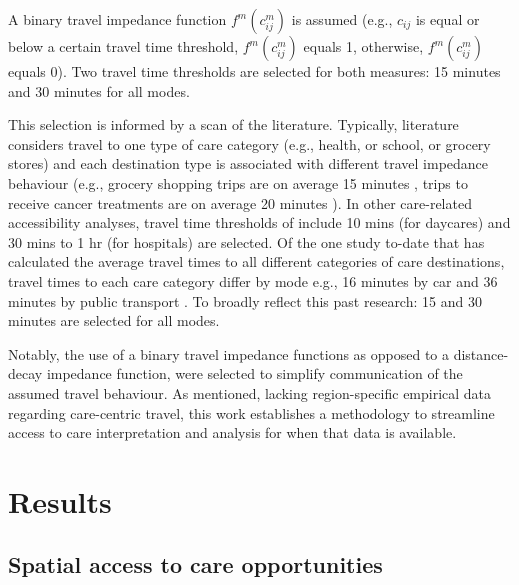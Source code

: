 \documentclass[
  authoryear,
  preprint,
  3p]{elsarticle}
\begin{document}
A binary travel impedance function \(f^m(c_{ij}^m)\) is assumed (e.g.,
\(c_{ij}\) is equal or below a certain travel time threshold,
\(f^m(c_{ij}^m)\) equals 1, otherwise, \(f^m(c_{ij}^m)\) equals 0). Two
travel time thresholds are selected for both measures: 15 minutes and 30
minutes for all modes.

This selection is informed by a scan of the literature. Typically,
literature considers travel to one type of care category (e.g., health,
or school, or grocery stores) and each destination type is associated
with different travel impedance behaviour (e.g., grocery shopping trips
are on average 15 minutes \citep{hamrickTimeCostAccess2012}, trips to
receive cancer treatments are on average 20 minutes
\citep{segelRuralurbanDifferencesAssociation2020}). In other
care-related accessibility analyses, travel time thresholds of include
10 mins (for daycares) \citep{fransenCommuterbasedTwostepFloating2015}
and 30 mins to 1 hr (for hospitals)
\citep{schuurmanDefiningRationalHospital2006} are selected. Of the one
study to-date that has calculated the average travel times to all
different categories of care destinations, travel times to each care
category differ by mode e.g., 16 minutes by car and 36 minutes by public
transport \citep{ravensbergenExploratoryAnalysisMobility2022}. To
broadly reflect this past research: 15 and 30 minutes are selected for
all modes.

Notably, the use of a binary travel impedance functions as opposed to a
distance-decay impedance function, were selected to simplify
communication of the assumed travel behaviour. As mentioned, lacking
region-specific empirical data regarding care-centric travel, this work
establishes a methodology to streamline access to care interpretation
and analysis for when that data is available.

\section{Results}\label{results}

\subsection{Spatial access to care
opportunities}\label{spatial-access-to-care-opportunities}
\end{document}
